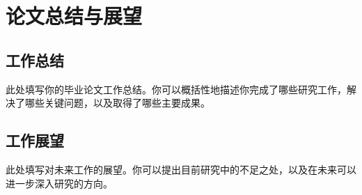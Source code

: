 \chapter{论文总结与展望}

\section{工作总结}
此处填写你的毕业论文工作总结。你可以概括性地描述你完成了哪些研究工作，解决了哪些关键问题，以及取得了哪些主要成果。

\section{工作展望}
此处填写对未来工作的展望。你可以提出目前研究中的不足之处，以及在未来可以进一步深入研究的方向。
